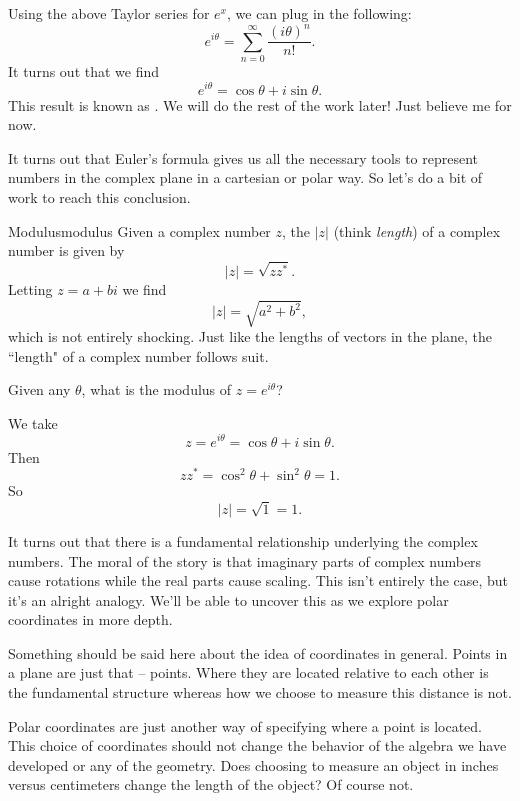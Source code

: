         Using the above Taylor series for $e^x$, we can plug in the following:
        \[
        e^{i\theta}=\sum_{n=0}^\infty \frac{(i\theta)^n}{n!}.
        \]
        It turns out that we find
        \[
        e^{i\theta} = \cos \theta + i \sin \theta.
        \]
        This result is known as . We will do the rest of the work later! Just believe me for now.

        It turns out that Euler's formula gives us all the necessary tools to represent numbers in the complex plane in a cartesian or polar way.  So let's do a bit of work to reach this conclusion.

        \begin{df}{Modulus}{modulus}
        Given a complex number $z$, the  $|z|$ (think \emph{length}) of a complex number is given by
        \[
        |z|=\sqrt{zz^*}.
        \]
        Letting $z=a+bi$ we find
        \[
        |z|=\sqrt{a^2+b^2},
        \]
        which is not entirely shocking.  Just like the lengths of vectors in the plane, the ``length" of a complex number follows suit.
        \end{df}

        \begin{question}
                Given any $\theta$, what is the modulus of $z=e^{i\theta}$?
        \end{question}

        \begin{answer}
        We take
        \[
        z=e^{i\theta}=\cos \theta + i \sin \theta.
        \]
        Then
        \[
        zz^*=\cos^2 \theta + \sin^2 \theta = 1.
        \]
        So
        \[
        |z|=\sqrt{1}=1.
        \]
        \end{answer}

        It turns out that there is a fundamental relationship underlying the complex numbers.  The moral of the story is that imaginary parts of complex numbers cause rotations while the real parts cause scaling. This isn't entirely the case, but it's an alright analogy. We'll be able to uncover this as we explore polar coordinates in more depth.

        \begin{remark}
        Something should be said here about the idea of coordinates in general.  Points in a plane are just that -- points.  Where they are located relative to each other is the fundamental structure whereas how we choose to measure this distance is not.

        Polar coordinates are just another way of specifying where a point is located.  This choice of coordinates should not change the behavior of the algebra we have developed or any of the geometry.  Does choosing to measure an object in inches versus centimeters change the length of the object? Of course not.
        \end{remark}

